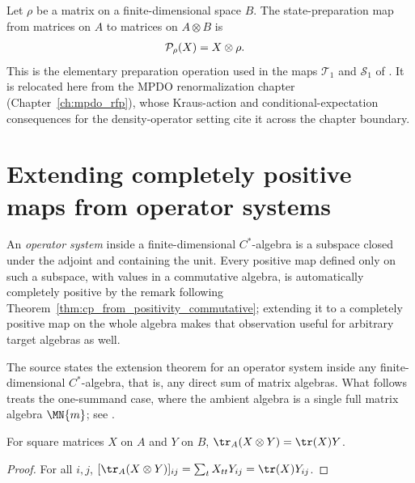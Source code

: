 \begin{definition}
    \label{def:mpdo_state_preparation_map}
    \leanok
    Let $\rho$ be a matrix on a finite-dimensional space $B$. The
    state-preparation map from matrices on $A$ to matrices on $A\otimes B$ is
    \begin{align}
        \mathcal P_\rho(X)&=X\otimes\rho.
        \notag
    \end{align}
    This is the elementary preparation operation used in the maps
    $\mathcal T_1$ and $\mathcal S_1$ of
    \cite[Appendix~C.2, lines~1527--1533 and~1551--1555]{Cirac2016MPDO_arXiv}.
    It is relocated here from the MPDO renormalization chapter
    (Chapter~\ref{ch:mpdo_rfp}), whose Kraus-action and
    conditional-expectation consequences for the density-operator setting
    cite it across the chapter boundary.
\end{definition}

\section{Extending completely positive maps from operator systems}

An \emph{operator system} inside a finite-dimensional $C^*$-algebra is a
subspace closed under the adjoint and containing the unit. Every positive
map defined only on such a subspace, with values in a commutative algebra,
is automatically completely positive by the remark following
Theorem~\ref{thm:cp_from_positivity_commutative}; extending it to a
completely positive map on the whole algebra makes that observation useful
for arbitrary target algebras as well.

The source states the extension theorem for an operator system inside any
finite-dimensional $C^*$-algebra, that is, any direct sum of matrix
algebras. What follows treats the one-summand case, where the ambient
algebra is a single full matrix algebra $\MN{m}$; see
.

\begin{theorem}
    \label{thm:mpdo_left_partial_trace_kronecker}
    \leanok
    For square matrices $X$ on $A$ and $Y$ on $B$,
    $\tr_{A}(X\otimes Y)=\tr(X)Y$.
\end{theorem}
\begin{proof}
    \leanok
    For all $i,j$,
    $[\tr_{A}(X\otimes Y)]_{ij}
    =\sum_t X_{tt}Y_{ij}=\tr(X)Y_{ij}$.
\end{proof}

